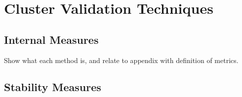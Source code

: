 \chapter{Cluster Validation Techniques}
\label{appendix_c}

\section{Internal Measures}
Show what each method is, and relate to appendix with definition of metrics.


\section{Stability Measures}






